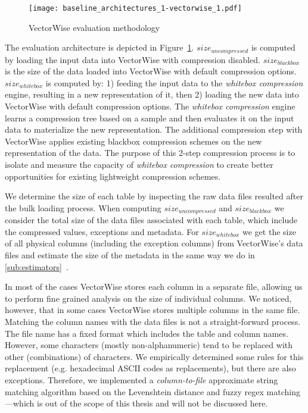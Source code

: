 \begin{figure}[h]
  \centering
  \texttt{[image: baseline\_architectures\_1-vectorwise\_1.pdf]}
  \caption{VectorWise evaluation methodology}
  \label{fig:eval:methodology:vectorwisebaseline}
\end{figure}

The evaluation architecture is depicted in Figure~\ref{fig:eval:methodology:vectorwisebaseline}. \(size_{uncompressed}\) is computed by loading the input data into VectorWise with compression disabled. \(size_{blackbox}\) is the size of the data loaded into VectorWise with default compression options. \(size_{whitebox}\) is computed by: 1) feeding the input data to the \textit{whitebox compression} engine, resulting in a new representation of it, then 2) loading the new data into VectorWise with default compression options. The \textit{whitebox compression} engine learns a compression tree based on a sample and then evaluates it on the input data to materialize the new representation. The additional compression step with VectorWise applies existing blackbox compression schemes on the new representation of the data. The purpose of this 2-step compression process is to isolate and measure the capacity of \textit{whitebox compression} to create better opportunities for existing lightweight compression schemes.

We determine the size of each table by inspecting the raw data files resulted after the bulk loading process. When computing \(size_{uncompressed}\) and \(size_{blackbox}\) we consider the total size of the data files associated with each table, which include the compressed values, exceptions and metadata. For \(size_{whitebox}\) we get the size of all physical columns (including the exception columns) from VectorWise's data files and estimate the size of the metadata in the same way we do in \ref{sub:estimators}~.

In most of the cases VectorWise stores each column in a separate file, allowing us to perform fine grained analysis on the size of individual columns. We noticed, however, that in some cases VectorWise stores multiple columns in the same file. Matching the column names with the data files is not a straight-forward process. The file name has a fixed format which includes the table and column names. However, some characters (mostly non-alphanumeric) tend to be replaced with other (combinations) of characters. We empirically determined some rules for this replacement (e.g. hexadecimal ASCII codes as replacements), but there are also exceptions. Therefore, we implemented a \textit{column-to-file} approximate string matching algorithm based on the Levenshtein distance \cite{levenshtein1966binary} and fuzzy regex matching \cite{pypiregex}---which is out of the scope of this thesis and will not be discussed here.

